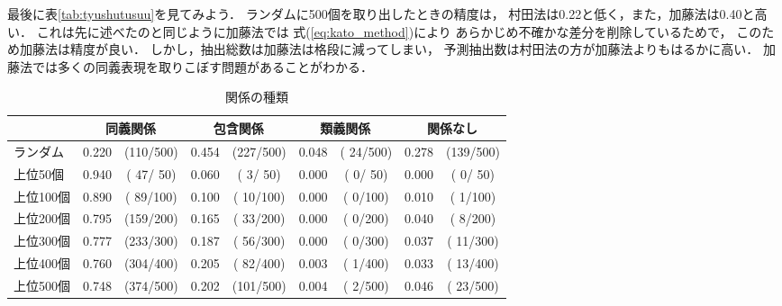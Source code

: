最後に表\ref{tab:tyushutusuu}を見てみよう．
ランダムに500個を取り出したときの精度は，
村田法は0.22と低く，また，加藤法は0.40と高い．
これは先に述べたのと同じように加藤法では
式(\ref{eq:kato_method})により
あらかじめ不確かな差分を削除しているためで，
このため加藤法は精度が良い．
しかし，抽出総数は加藤法は格段に減ってしまい，
予測抽出数は村田法の方が加藤法よりもはるかに高い．
加藤法では多くの同義表現を取りこぼす問題があることがわかる．

\begin{table*}[t]
  \begin{center}
    \leavevmode
    \caption{関係の種類}
    \label{tab:kankei1}
\begin{tabular}[h]{|l|r@{ }c|r@{ }c|r@{ }c|r@{ }c|}\hline
\multicolumn{1}{|c|}{} & \multicolumn{2}{|c|}{同義関係} & \multicolumn{2}{|c|}{包含関係} & \multicolumn{2}{|c|}{類義関係} & \multicolumn{2}{|c|}{関係なし} \\\hline
ランダム  & 0.220 & (110/500)& 0.454 & (227/500)& 0.048 & ( 24/500)& 0.278 & (139/500)\\\hline
上位50個  & 0.940 & ( 47/ 50)& 0.060 & (  3/ 50)& 0.000 & (  0/ 50)& 0.000 & (  0/ 50)\\
上位100個 & 0.890 & ( 89/100)& 0.100 & ( 10/100)& 0.000 & (  0/100)& 0.010 & (  1/100)\\
上位200個 & 0.795 & (159/200)& 0.165 & ( 33/200)& 0.000 & (  0/200)& 0.040 & (  8/200)\\
上位300個 & 0.777 & (233/300)& 0.187 & ( 56/300)& 0.000 & (  0/300)& 0.037 & ( 11/300)\\
上位400個 & 0.760 & (304/400)& 0.205 & ( 82/400)& 0.003 & (  1/400)& 0.033 & ( 13/400)\\
上位500個 & 0.748 & (374/500)& 0.202 & (101/500)& 0.004 & (  2/500)& 0.046 & ( 23/500)\\\hline
\end{tabular}
\end{center}
\end{table*}

